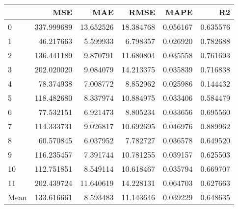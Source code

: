 \begin{tabular}{lrrrrr}
\toprule
 & MSE & MAE & RMSE & MAPE & R2 \\
\midrule
0 & 337.999689 & 13.652526 & 18.384768 & 0.056167 & 0.635576 \\
1 & 46.217663 & 5.599933 & 6.798357 & 0.026920 & 0.782688 \\
2 & 136.441189 & 9.870791 & 11.680804 & 0.035558 & 0.761693 \\
3 & 202.020020 & 9.084079 & 14.213375 & 0.035839 & 0.716838 \\
4 & 78.374938 & 7.008772 & 8.852962 & 0.025986 & 0.144432 \\
5 & 118.482680 & 8.337974 & 10.884975 & 0.033406 & 0.584479 \\
6 & 77.532151 & 6.921473 & 8.805234 & 0.033656 & 0.695560 \\
7 & 114.333731 & 9.026817 & 10.692695 & 0.046976 & 0.889962 \\
8 & 60.570845 & 6.037952 & 7.782727 & 0.036578 & 0.649520 \\
9 & 116.235457 & 7.391744 & 10.781255 & 0.039157 & 0.625503 \\
10 & 112.751851 & 8.549114 & 10.618467 & 0.035794 & 0.669707 \\
11 & 202.439724 & 11.640619 & 14.228131 & 0.064703 & 0.627663 \\
Mean & 133.616661 & 8.593483 & 11.143646 & 0.039229 & 0.648635 \\
\bottomrule
\end{tabular}

